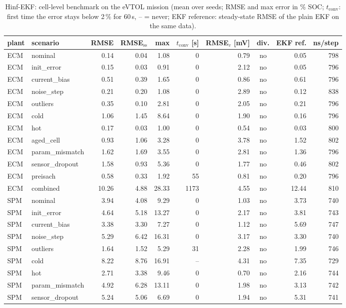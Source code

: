 \begin{table}[H]\centering\footnotesize\setlength{\tabcolsep}{4pt}
\caption{Hinf-EKF: cell-level benchmark on the eVTOL mission (mean over seeds; RMSE and max error in \% SOC; $t_\mathrm{conv}$: first time the error stays below 2\,\% for 60\,s, -- = never; EKF reference: steady-state RMSE of the plain EKF on the same data).}\label{tab:cell_HinfEKF}
\begin{tabular}{llrrrrrcrr}\toprule
plant & scenario & RMSE & RMSE$_\mathrm{ss}$ & max & $t_\mathrm{conv}$ [s] & RMSE$_v$ [mV] & div. & EKF ref. & ns/step \\ \midrule
ECM & nominal & 0.14 & 0.04 & 1.08 & 0 & 0.79 & no & 0.05 & 798 \\
ECM & init\_error & 0.15 & 0.03 & 0.91 & 0 & 2.12 & no & 0.05 & 796 \\
ECM & current\_bias & 0.51 & 0.39 & 1.65 & 0 & 0.86 & no & 0.61 & 796 \\
ECM & noise\_step & 0.21 & 0.20 & 1.08 & 0 & 2.89 & no & 0.12 & 838 \\
ECM & outliers & 0.35 & 0.10 & 2.81 & 0 & 2.05 & no & 0.21 & 796 \\
ECM & cold & 1.06 & 1.45 & 8.64 & 0 & 1.90 & no & 0.16 & 796 \\
ECM & hot & 0.17 & 0.03 & 1.00 & 0 & 0.54 & no & 0.03 & 800 \\
ECM & aged\_cell & 0.93 & 1.06 & 3.28 & 0 & 3.78 & no & 1.52 & 802 \\
ECM & param\_mismatch & 1.62 & 1.69 & 3.55 & 0 & 2.81 & no & 1.36 & 796 \\
ECM & sensor\_dropout & 1.58 & 0.93 & 5.36 & 0 & 1.77 & no & 0.46 & 802 \\
ECM & preisach & 0.58 & 0.33 & 1.92 & 55 & 0.81 & no & 0.20 & 796 \\
ECM & combined & 10.26 & 4.88 & 28.33 & 1173 & 4.55 & no & 12.44 & 810 \\
\midrule
SPM & nominal & 3.94 & 4.08 & 9.29 & 0 & 1.03 & no & 3.73 & 740 \\
SPM & init\_error & 4.64 & 5.18 & 13.27 & 0 & 2.17 & no & 3.81 & 743 \\
SPM & current\_bias & 3.38 & 3.30 & 7.27 & 0 & 1.12 & no & 5.69 & 747 \\
SPM & noise\_step & 5.29 & 6.42 & 16.31 & 0 & 3.17 & no & 3.30 & 740 \\
SPM & outliers & 1.64 & 1.52 & 5.29 & 31 & 2.28 & no & 1.99 & 746 \\
SPM & cold & 8.22 & 8.76 & 16.91 & -- & 4.31 & no & 7.35 & 729 \\
SPM & hot & 2.71 & 3.38 & 9.46 & 0 & 0.70 & no & 2.16 & 744 \\
SPM & param\_mismatch & 4.92 & 6.28 & 13.11 & 0 & 1.98 & no & 3.13 & 742 \\
SPM & sensor\_dropout & 5.24 & 5.06 & 6.69 & 0 & 1.94 & no & 5.31 & 741 \\
\bottomrule\end{tabular}\end{table}
